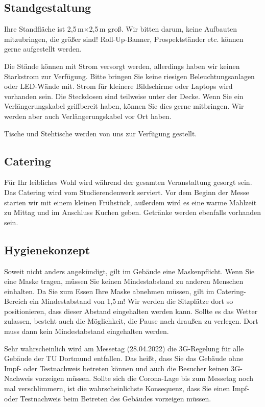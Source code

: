 \documentclass[
  paper=a4,
  fontsize=12pt,
  DIV=16,
  headheight=30pt,
  footheight=45pt,
  headinclude,
  parskip=half,
]{scrartcl}
\begin{document}
\subsection*{Standgestaltung}
Ihre Standfläche ist 2,5\,m$\times$2,5\,m groß.
Wir bitten darum, keine Aufbauten mitzubringen, die größer sind!
Roll-Up-Banner, Prospektständer etc. können gerne aufgestellt werden.

Die Stände können mit Strom versorgt werden, allerdings haben wir keinen Starkstrom zur Verfügung.
Bitte bringen Sie keine riesigen Beleuchtungsanlagen oder LED-Wände mit.
Strom für kleinere Bildschirme oder Laptops wird vorhanden sein.
Die Steckdosen sind teilweise unter der Decke.
Wenn Sie ein Verlängerungskabel griffbereit haben, können Sie dies gerne mitbringen.
Wir werden aber auch Verlängerungskabel vor Ort haben.

Tische und Stehtische werden von uns zur Verfügung gestellt.


\subsection*{Catering}
Für Ihr leibliches Wohl wird während der gesamten Veranstaltung gesorgt sein.
Das Catering wird vom Studierendenwerk serviert.
Vor dem Beginn der Messe starten wir mit einem kleinen Frühstück, außerdem wird es eine warme Mahlzeit zu Mittag und im Anschluss Kuchen geben.
Getränke werden ebenfalls vorhanden sein.


\subsection*{Hygienekonzept}
Soweit nicht anders angekündigt, gilt im Gebäude eine Maskenpflicht.
Wenn Sie eine Maske tragen, müssen Sie keinen Mindestabstand zu anderen Menschen einhalten.
Da Sie zum Essen Ihre Maske abnehmen müssen, gilt im Catering-Bereich ein Mindestabstand von 1,5\,m!
Wir werden die Sitzplätze dort so positionieren, dass dieser Abstand eingehalten werden kann.
Sollte es das Wetter zulassen, besteht auch die Möglichkeit, die Pause nach draußen zu verlegen.
Dort muss dann kein Mindestabstand eingehalten werden.

Sehr wahrscheinlich wird am Messetag (28.04.2022) die 3G-Regelung für alle Gebäude der TU Dortmund entfallen.
Das heißt, dass Sie das Gebäude ohne Impf- oder Testnachweis betreten können und auch die Besucher keinen 3G-Nachweis vorzeigen müssen.
Sollte sich die Corona-Lage bis zum Messetag noch mal verschlimmern, ist die wahrscheinlichste Konsequenz, dass Sie einen Impf- oder Testnachweis beim Betreten des Gebäudes vorzeigen müssen.
\end{document}
